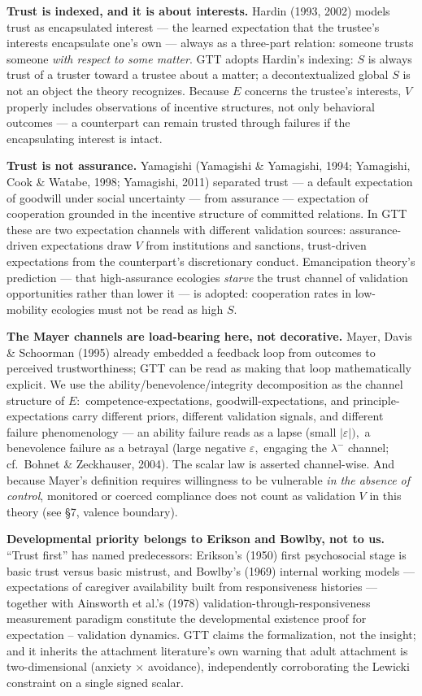 \documentclass[
]{article}
\begin{document}
\textbf{Trust is indexed, and it is about interests.} Hardin (1993,
2002) models trust as encapsulated interest --- the learned expectation
that the trustee's interests encapsulate one's own --- always as a
three-part relation: someone trusts someone \emph{with respect to some
matter}. GTT adopts Hardin's indexing: \(S\) is always trust of a
truster toward a trustee about a matter; a decontextualized global \(S\)
is not an object the theory recognizes. Because \(E\) concerns the
trustee's interests, \(V\) properly includes observations of incentive
structures, not only behavioral outcomes --- a counterpart can remain
trusted through failures if the encapsulating interest is intact.

\textbf{Trust is not assurance.} Yamagishi (Yamagishi \& Yamagishi,
1994; Yamagishi, Cook \& Watabe, 1998; Yamagishi, 2011) separated trust
--- a default expectation of goodwill under social uncertainty --- from
assurance --- expectation of cooperation grounded in the incentive
structure of committed relations. In GTT these are two expectation
channels with different validation sources: assurance-driven
expectations draw \(V\) from institutions and sanctions, trust-driven
expectations from the counterpart's discretionary conduct. Emancipation
theory's prediction --- that high-assurance ecologies \emph{starve} the
trust channel of validation opportunities rather than lower it --- is
adopted: cooperation rates in low-mobility ecologies must not be read as
high \(S.\)

\textbf{The Mayer channels are load-bearing here, not decorative.}
Mayer, Davis \& Schoorman (1995) already embedded a feedback loop from
outcomes to perceived trustworthiness; GTT can be read as making that
loop mathematically explicit. We use the ability/benevolence/integrity
decomposition as the channel structure of \(E:\)
competence-expectations, goodwill-expectations, and
principle-expectations carry different priors, different validation
signals, and different failure phenomenology --- an ability failure
reads as a lapse (small \(|\varepsilon|),\) a benevolence failure as a
betrayal (large negative \(\varepsilon,\) engaging the \(\lambda^{-}\)
channel; cf.~Bohnet \& Zeckhauser, 2004). The scalar law is asserted
channel-wise. And because Mayer's definition requires willingness to be
vulnerable \emph{in the absence of control}, monitored or coerced
compliance does not count as validation \(V\) in this theory (see §7,
valence boundary).

\textbf{Developmental priority belongs to Erikson and Bowlby, not to
us.} ``Trust first'' has named predecessors: Erikson's (1950) first
psychosocial stage is basic trust versus basic mistrust, and Bowlby's
(1969) internal working models --- expectations of caregiver
availability built from responsiveness histories --- together with
Ainsworth et al.'s (1978) validation-through-responsiveness measurement
paradigm constitute the developmental existence proof for expectation --
validation dynamics. GTT claims the formalization, not the insight; and
it inherits the attachment literature's own warning that adult
attachment is two-dimensional (anxiety \(\times\) avoidance),
independently corroborating the Lewicki constraint on a single signed
scalar.
\end{document}
